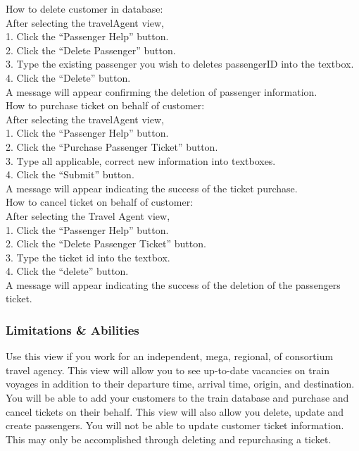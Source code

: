 \documentclass[letter]{article}
\begin{document}
How to delete customer in database:\\
After selecting the travelAgent view,\\ 
1. Click the “Passenger Help” button.\\
2. Click the “Delete Passenger” button.\\
3. Type the existing passenger you wish to deletes  passengerID into the textbox.\\
4. Click the “Delete” button. \\
A message will appear confirming the deletion of  passenger information.\\


How to purchase ticket on behalf of customer:\\
After selecting the travelAgent view,\\ 
1. Click the “Passenger Help” button.\\
2. Click the “Purchase Passenger Ticket” button.\\
3. Type all applicable, correct new information into textboxes.\\
4. Click the “Submit” button.\\
A message will appear indicating the success of the ticket purchase.\\


How to cancel ticket on behalf of customer:\\
After selecting the Travel Agent view,\\
1. Click the “Passenger Help” button.\\
2. Click the “Delete Passenger Ticket” button. \\
3. Type the ticket id into the textbox.\\
4. Click the “delete” button.\\
A message will appear indicating the success of the deletion of the passengers ticket.\\ 




\subsubsection{Limitations \& Abilities}
Use this view if you work for an independent, mega, regional, of consortium travel agency. This view will allow you to see up-to-date vacancies on train voyages in addition to their departure time, arrival time, origin, and destination. You will be able to add your customers to the train database and purchase and cancel tickets on their behalf. This view will also allow you delete, update and create passengers. You will not be able to update customer ticket information. This may only be accomplished through deleting and repurchasing a ticket. 
\end{document}
